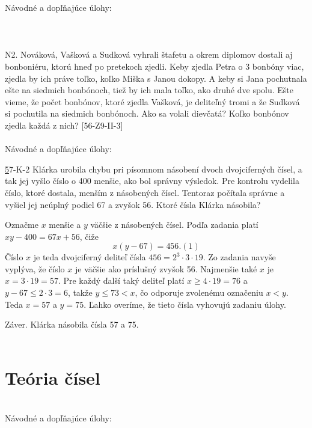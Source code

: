 Návodné a dopľňajúce úlohy:\\
\\
\\
\\
N2. Nováková, Vašková a Sudková vyhrali štafetu a okrem diplomov dostali aj bonboniéru, ktorú hneď po pretekoch zjedli. Keby zjedla Petra o 3 bonbóny viac, zjedla by ich práve toľko, koľko Miška s Janou dokopy. A keby si Jana pochutnala ešte na siedmich bonbónoch, tiež by ich mala toľko, ako druhé dve spolu. Ešte vieme, že počet bonbónov, ktoré zjedla Vašková, je deliteľný tromi a že Sudková si pochutila na siedmich bonbónoch. Ako sa volali dievčatá? Koľko bonbónov zjedla každá z nich? [56-Z9-II-3]\\
\\

Návodné a dopľňajúce úlohy:
\\
\begin{tcolorbox}[breakable,notitle,boxrule=0pt,colback=light-gray,colframe=light-gray]\ul 57-K-2
Klárka urobila chybu pri písomnom násobení dvoch dvojciferných čísel, a tak jej vyšlo číslo o 400 menšie, ako bol správny výsledok. Pre kontrolu vydelila číslo, ktoré dostala, menším z násobených čísel. Tentoraz počítala správne a vyšiel jej neúplný podiel 67 a zvyšok 56. Ktoré čísla Klárka násobila?

\end{tcolorbox}

\rie Označme $x$ menšie a $y$ väčšie z násobených čísel. Podľa zadania platí $xy - 400 = 67x + 56$, čiže
$$x(y - 67) = 456. (1)$$
Číslo $x$ je teda dvojciferný deliteľ čísla $456 = 2^3\cdot 3 \cdot 19$. Zo zadania navyše vyplýva,
že číslo $x$ je väčšie ako príslušný zvyšok 56. Najmenšie také $x$ je $x = 3 \cdot 19 = 57$. Pre
každý ďalší taký deliteľ platí $x \geq 4 \cdot 19 = 76$ a $y - 67 \leq 2 \cdot 3 = 6$, takže $y \leq 73 < x$, čo odporuje zvolenému označeniu $x < y$. Teda $x = 57$ a $y = 75$. Ľahko overíme, že tieto čísla vyhovujú zadaniu úlohy.

Záver. Klárka násobila čísla 57 a 75.\\
\\

\newpage
\section{Teória čísel}


\\
Návodné a dopľňajúce úlohy:\\
\\

